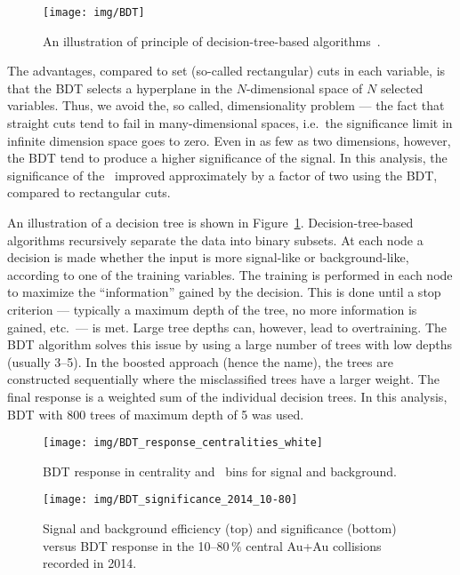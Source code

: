 \begin{figure}[!htb]
\centering
\texttt{[image: img/BDT]}
\caption[An illustration of principle of decision-tree-based algorithms.]{\label{BDT}An illustration of principle of decision-tree-based algorithms~\cite{TMVA}\@.}
\end{figure}

The advantages, compared to set (so-called rectangular) cuts in each variable, is that the BDT selects a hyperplane in the $N$-dimensional space of $N$ selected variables. Thus, we avoid the, so called, dimensionality problem --- the fact that straight cuts tend to fail in many-dimensional spaces, i.e.\ the significance limit in infinite dimension space goes to zero. Even in as few as two dimensions, however, the BDT tend to produce a higher significance of the signal. In this analysis, the significance of the \Lambdac\ improved approximately by a factor of two using the BDT, compared to rectangular cuts.


An illustration of a decision tree is shown in Figure~\ref{BDT}\@. Decision-tree-based algorithms recursively separate the data into binary subsets. At each node a decision is made whether the input is more signal-like or background-like, according to one of the training variables. The training is performed in each node to maximize the ``information'' gained by the decision. This is done until a stop criterion --- typically a maximum depth of the tree, no more information is gained, etc.\ --- is met. Large tree depths can, however, lead to overtraining. The BDT algorithm solves this issue by using a large number of trees with low depths (usually 3--5)\@. In the boosted approach (hence the name), the trees are constructed sequentially where the misclassified trees have a larger weight. The final response is a weighted sum of the individual decision trees. In this analysis, BDT with 800 trees of maximum depth of 5 was used.


\begin{figure}[!htb]
\centering
\texttt{[image: img/BDT\_response\_centralities\_white]}
\caption[BDT response in centrality and \pt\ bins for signal and background.]{\label{BDT_centralities}BDT response in centrality and \pt\ bins for signal and background.}
\end{figure}


\begin{figure}[!p]
\vspace{-0.7cm}
\centering
\texttt{[image: img/BDT\_significance\_2014\_10-80]}
\vspace{-1cm}
\caption[Signal and background efficiency and significance versus BDT response in the 10--80$\,\%$ central Au+Au collisions recorded in 2014.]{\label{BDT_sig_2014_pt}Signal and background efficiency (top) and significance (bottom) versus BDT response in the 10--80$\,\%$ central Au+Au collisions recorded in 2014.}
\end{figure}


